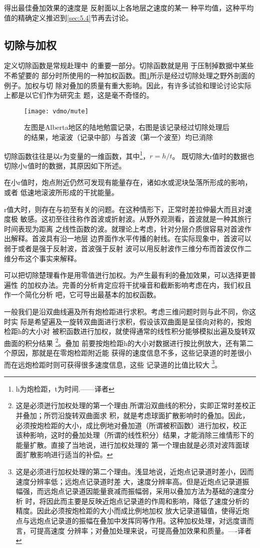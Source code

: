 得出最佳叠加效果的速度是 反射面以上各地层之速度的某一
种平均值，这种平均值的精确定义推迟到\ref{sec:5.4}节再去讨论。

\subsection{切除与加权}
\label{sec:3.5.3}

定义切除函数是常规赴理中
的重要一部分。切除函数就是用 于压制掉数据中某些不希望要的
部分时所使用的一种加权函数。图\ref{fig:vdmo/mute}所示是经过切除处理之野外剖面的例子。加权与切
除对叠加的质量有重大影晌。因此，有许多试验和理论讨论实际上都是以它们作为研究主
题，这是毫不奇怪的。

\begin{figure}[H]
\centering
\texttt{[image: vdmo/mute]}
\caption[mute]{左图是Alberta地区的陆地勉震记录，右图是该记录经过切除处理后
的结果，地滚波（记录中部）与首波（第一个波至）均已消除}
\label{fig:vdmo/mute}
\end{figure}

切除函数往往是以r为变量的一维函数，其中\footnote{h为炮检距，t为时间.------译者}，$r=h/t$。
既切除大r值时的数据也切除小r值时的数据，其原因如下所述。

在小r值时，炮点附近仍然可发现有能量存在，诸如水或泥块坠落所形成的影响，或者
低速地滚波所形成的干扰能量。

r值大时，则存在与初至有关的问题。在这种情形下，正常时差拉伸最大而且对速度极
敏感。这初至往往称作首波或折射波。从野外观测看，首波就是一种其旅行时间表现为距离
之线性函数的波。就理论上考虑，针对分层介质很容易对首波作出解释。首波具有沿一地层
边界面作水平传播的射线。在实际现象中，首波可以弱于或者是强于反射波，首波强于反射
波可以用反射波作三维分布而首波仅作二维分布这个事实来解释。

可以把切除楚理看作是用零值迸行加权。为产生最有利的叠加效果，可以选择更普遍性
的加权办法。完善的分析肯定应将干扰噪音和截断影响考虑在内，我们权且作一个简化分析
吧，它可导出最基本的加权函数。

一般我们是沿双曲线遍及所有炮检距进行求积。考虑三维问题时则与此不同，你这时实
际是希望遍及一旋转双曲面进行求积，假设该双曲面是呈径向对称的，按炮检距h的大小对
被积函数进行加权，就使得通常的线性积分能够模拟出遍及旋转双曲面的积分结果
\footnote{这是必须迸行加权处理的第一个理由.所谓沿双曲线的积分，实即正常时差校正并叠加；所罚沿旋转双曲面求
积，就是考虑球面扩散影响时的叠加。因此，必须按炮检距的大小，成比例地对叠加道（所谓被积函数）进行加权，校正
该种影响，这时的叠加处理（所谓的线性积分）结果，才能消除三维情形下的能量扩散。直接了当地说，进行加权处理的
第一个理由就是必须对波阵面球面扩散影响进行适当的补偿。}。叠加
前要按炮检距h的大小对数据进行按比例放大，还有第二个原因，那就是在零炮检距附近能
获得的速度信息不多，这些记录道的时差很小而在远炮检距时则可获得很多速度信息，这些
记录道的比值比较大
\footnote{这是必须进行加权处理的第二个理由。浅显地说，近炮点记录道时差小，因而速度分辨率低；远炮点记录道时差
大，速度分辨率高。但是近炮点记录道振幅强，而远炮点记录道因能量衰减而振幅弱，采用以叠加方法为基础的速度分析
时，将因此而主要是反映近炮点记录道的作周和影响，降低了速度分析的精度。因此必须按炮检距的大小而成比例地加权
放大记录道辐值，使得近炮点与远炮点记录道的振幅在叠加中发挥同等作用。这种加权处理，对远度谱而言，可提高速度
分辨率；对叠加处理来说，可提高叠加效果和质量。----译者}。


